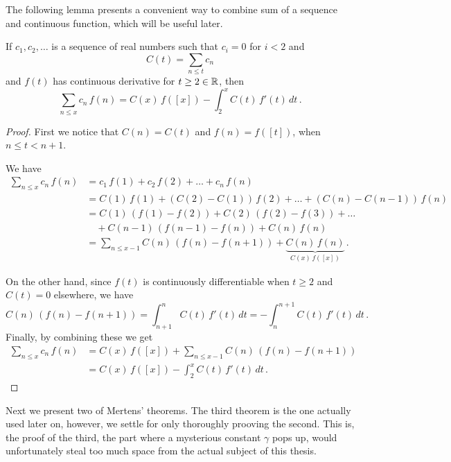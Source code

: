 \documentclass{article}
\begin{document}
The following lemma presents a convenient way to combine sum of a sequence and continuous function, which will be useful later.

\begin{lemma}
\label{lemma:mertenapu}
\cite{HW:mertens}
If $c_1, c_2,\dots$ is a sequence of real numbers such that $c_i=0$ for $i<2$ and
\begin{equation*}
    C(t) = \sum_{n\leq t} c_n
\end{equation*}
and $f(t)$ has continuous derivative for $t \geq 2 \in \mathbb{R}$, then
\begin{equation*}
    \sum_{n\leq x} c_n\,f(n) = C(x)\,f([x])-\int_2^x C(t)\,f'(t)\,dt\,.
\end{equation*}

\begin{proof}
First we notice that $C(n) = C(t)$ and $f(n)=f([t])$, when $n\leq t < n+1$.

We have
\begin{align*}
    \sum_{n\leq x} c_n\,f(n) & = c_1\,f(1) + c_2\,f(2) + \dots + c_n\,f(n)\\
    & =  C(1)\,f(1) + (C(2)-C(1))\,f(2) + \dots + (C(n)-C(n-1))\,f(n)\\
    & = C(1)\,(f(1)-f(2)) + C(2)\,(f(2)-f(3)) + \dots\\
    & \quad + C(n-1)\,(f(n-1)-f(n)) + C(n)\,f(n)\\
    & = \sum_{n\leq x-1} C(n)\,(f(n)-f(n+1)) + \underbrace{C(n)\,f(n)}_\text{$C(x)\,f([x])$}\,.
\end{align*}

On the other hand, since $f(t)$ is continuously differentiable when $t\geq2$ and $C(t)=0$ elsewhere, we have
\begin{equation*}
     C(n)\,(f(n)-f(n+1)) = \int_{n+1}^n C(t)\,f'(t)\,dt = -\int_n^{n+1} C(t)\,f'(t)\,dt\,.
\end{equation*}
Finally, by combining these we get
\begin{align*}
    \sum_{n\leq x} c_n\,f(n) & = C(x)\,f([x]) + \sum_{n\leq x-1} C(n)\,(f(n)-f(n+1))\\
    & = C(x)\,f([x])-\int_2^x C(t)\,f'(t)\,dt\,.
\end{align*}

\end{proof}
\end{lemma}

Next we present two of Mertens' theorems. The third theorem is the one actually used later on, however, we settle for only thoroughly prooving the second. This is, the proof of the third, the part where a mysterious constant $\gamma$ pops up, would unfortunately steal too much space from the actual subject of this thesis.
\end{document}
